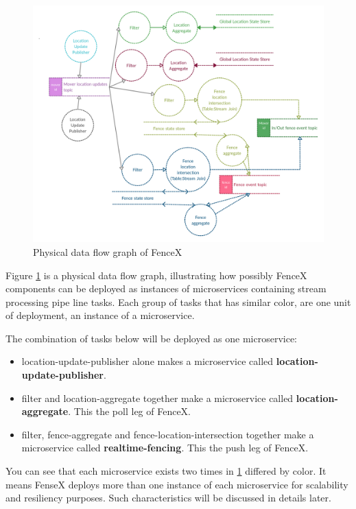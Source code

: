 \documentclass[a4]{report}
\begin{document}
    \begin{figure}[ht]
        \caption{Physical data flow graph of FenceX}
        \label{fig:physical-dfg}
        \includegraphics[scale=0.2]{images/physical-data-flow-diagram.png}

    \end{figure}

    Figure \ref{fig:physical-dfg} is a physical data flow graph, illustrating how possibly FenceX components can be deployed as instances of microservices containing stream processing pipe line tasks. Each group of tasks that has similar color, are one unit of deployment, an instance of a microservice.

    The combination of tasks below will be deployed as one microservice:
    \begin{itemize}
        \item{location-update-publisher} alone makes a microservice called \textbf{location-update-publisher}.
        \item{filter and location-aggregate} together make a microservice called \textbf{location-aggregate}. This the poll leg of FenceX.
        \item{filter, fence-aggregate and fence-location-intersection} together make a microservice called \textbf{realtime-fencing}. This the push leg of FenceX.
    \end{itemize}

    You can see that each microservice exists two times in \ref{fig:physical-dfg} differed by color. It means FenseX deploys more than one instance of each microservice for scalability and resiliency purposes.
    Such characteristics will be discussed in details later.
\end{document}
